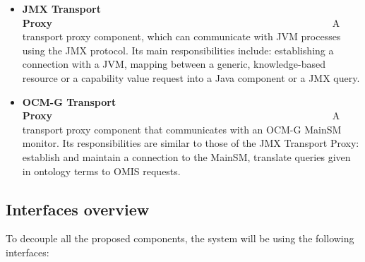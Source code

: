 \begin{itemize}
\item {\bf JMX Transport Proxy}~~~~~~~~~~~~~~~~~~~~~~~~~~~~~~~~~~~~~~~~~~~~~~~~~~~~~~~~\linebreak
A transport proxy component, which can communicate with JVM processes using the JMX protocol. Its main responsibilities include: establishing a connection with a JVM, mapping between a generic, knowledge-based resource or a capability value request into a Java component or a JMX query.

\item {\bf OCM-G Transport Proxy}~~~~~~~~~~~~~~~~~~~~~~~~~~~~~~~~~~~~~~~~~~~~~~~~~~~~~~~~\linebreak
A transport proxy component that communicates with an OCM-G MainSM monitor. Its responsibilities are similar to those of the JMX Transport Proxy: establish and maintain a connection to the MainSM, translate queries given in ontology terms to OMIS requests.

\end{itemize}

\subsection{Interfaces overview}

To decouple all the proposed components, the system will be using the following interfaces:

